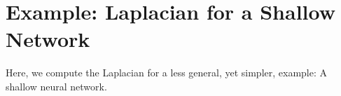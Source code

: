 

\section{Example: Laplacian for a Shallow Network}

Here, we compute the Laplacian for a less general, yet simpler, example: A shallow neural network.

\begin{comment}
  For the one-dimensional shallow case we have
  \[ u_\theta(x) = \sum_{i=1}^m a_i\sigma(b_i x + c_i) + d. \]
  Then
  \[ u_\theta'(x) = \sum_{i=1}^m a_ib_i\sigma'(b_i x + c_i) \]
  and
  \[ u_\theta''(x) = \sum_{i=1}^m a_ib_i^2\sigma''(b_i x + c_i). \]
  The parameter derivative of the Laplacian (i.e., second-order derivative)
  \begin{align*}
    \partial_{a_i}u_\theta''(x) & = b_i^2\sigma''(b_i x + c_i) \\
    \partial_{b_i}u_\theta''(x) & = 2a_ib_i\sigma''(b_i x + c_i) + a_i b_i^2x\sigma^{(3)}(b_i x + c_i) \\
    \partial_{c_i}u_\theta''(x) & = a_i b_i^2\sigma^{(3)}(b_i x + c_i) \\
    \partial_{d}u_\theta''(x) & = 0.
  \end{align*}
  The parameter derivative of the Laplacian (i.e., second-order derivative)
  \begin{align*}
    \partial_{a_i}u_\theta''(x) & = b_i^2\sigma''(b_i x + c_i) \\
    \partial_{b_i}u_\theta''(x) & = 2a_ib_i\sigma''(b_i x + c_i) + a_i b_i^2x\sigma^{(3)}(b_i x + c_i) \\
    \partial_{c_i}u_\theta''(x) & = a_i b_i^2\sigma^{(3)}(b_i x + c_i) \\
    \partial_{d}u_\theta''(x) & = 0.
  \end{align*}
\end{comment}

